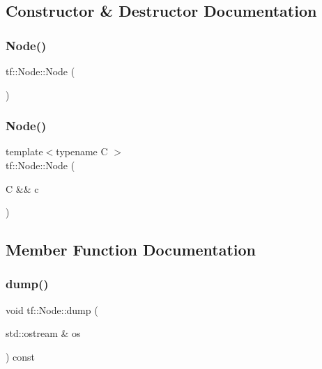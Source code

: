 \subsection{Constructor \& Destructor Documentation}
\mbox{\label{classtf_1_1Node_a6b1092cf320099a755253a6272d71e66}} 
\subsubsection{\texorpdfstring{Node()}{Node()}\hspace{0.1cm}{\footnotesize\ttfamily [1/2]}}
{\footnotesize\ttfamily tf\+::\+Node\+::\+Node (\begin{DoxyParamCaption}{ }\end{DoxyParamCaption})\hspace{0.3cm}{\ttfamily [inline]}}

\mbox{\label{classtf_1_1Node_ac4f83d80151907262972711fdfdcb177}} 
\subsubsection{\texorpdfstring{Node()}{Node()}\hspace{0.1cm}{\footnotesize\ttfamily [2/2]}}
{\footnotesize\ttfamily template$<$typename C $>$ \\
tf\+::\+Node\+::\+Node (\begin{DoxyParamCaption}\item[{C \&\&}]{c }\end{DoxyParamCaption})\hspace{0.3cm}{\ttfamily [inline]}}



\subsection{Member Function Documentation}
\mbox{\label{classtf_1_1Node_a5b52f4d47173b28917d7361ea8af06d3}} 
\subsubsection{\texorpdfstring{dump()}{dump()}\hspace{0.1cm}{\footnotesize\ttfamily [1/2]}}
{\footnotesize\ttfamily void tf\+::\+Node\+::dump (\begin{DoxyParamCaption}\item[{std\+::ostream \&}]{os }\end{DoxyParamCaption}) const\hspace{0.3cm}{\ttfamily [inline]}}

